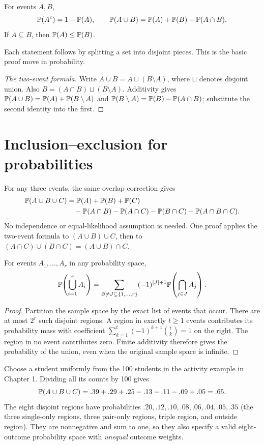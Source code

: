 \begin{proposition}
For events $A,B$,
\[
\P(A^c)=1-\P(A),\qquad
\P(A\cup B)=\P(A)+\P(B)-\P(A\cap B).
\]
If $A\subseteq B$, then $\P(A)\le \P(B)$.
\end{proposition}

Each statement follows by splitting a set into disjoint pieces. This is the basic proof move in probability.

\begin{proof}[The two-event formula]
Write $A\cup B=A\sqcup(B\setminus A)$, where $\sqcup$ denotes disjoint
union. Also $B=(A\cap B)\sqcup(B\setminus A)$. Additivity gives
$\P(A\cup B)=\P(A)+\P(B\setminus A)$ and
$\P(B\setminus A)=\P(B)-\P(A\cap B)$; substitute the second identity
into the first.
\end{proof}

\section{Inclusion--exclusion for probabilities}

For any three events, the same overlap correction gives
\begin{align*}
\P(A\cup B\cup C)
&=\P(A)+\P(B)+\P(C)\\
&\quad-\P(A\cap B)-\P(A\cap C)-\P(B\cap C)
  +\P(A\cap B\cap C).
\end{align*}
No independence or equal-likelihood assumption is needed.
One proof applies the two-event formula to $(A\cup B)\cup C$, then
to $(A\cap C)\cup(B\cap C)=(A\cup B)\cap C$.

\begin{theorem}
For events $A_1,\ldots,A_r$ in any probability space,
\[
\P\!\left(\bigcup_{i=1}^r A_i\right)
=\sum_{\varnothing\ne J\subseteq\{1,\ldots,r\}}
(-1)^{|J|+1}\P\!\left(\bigcap_{j\in J}A_j\right).
\]
\end{theorem}
\begin{proof}
Partition the sample space by the exact list of events that occur.
There are at most $2^r$ such disjoint regions. A region in
exactly $t\ge1$ events contributes its probability mass with coefficient
$\sum_{k=1}^t(-1)^{k+1}\binom tk=1$ on the right. The region in no event
contributes zero. Finite additivity therefore gives the probability of
the union, even when the original sample space is infinite.
\end{proof}

\begin{example}
Choose a student uniformly from the 100 students in the activity example
in Chapter 1. Dividing all its counts by 100 gives
\[
\P(A\cup B\cup C)=.39+.29+.25-.13-.11-.09+.05=.65.
\]
The eight disjoint regions have probabilities
$.20,.12,.10,.08,.06,.04,.05,.35$ (the three single-only regions,
three pair-only regions, triple region, and outside region).
They are nonnegative and sum to one, so they also specify a valid
eight-outcome probability space with \emph{unequal} outcome weights.
\end{example}

